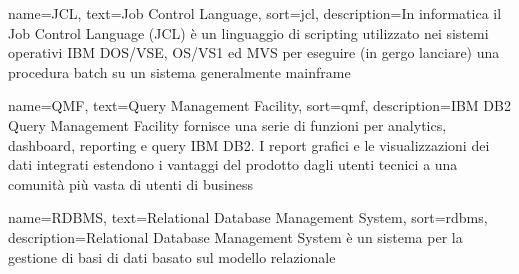
{
    name=JCL,
    text=Job Control Language,
    sort=jcl,
    description={In informatica il Job Control Language (JCL) è un linguaggio di scripting utilizzato nei sistemi operativi IBM DOS/VSE, OS/VS1 ed MVS per eseguire (in gergo lanciare) una procedura batch su un sistema generalmente mainframe}
}





{
    name=QMF,
    text=Query Management Facility,
    sort=qmf,
    description={IBM DB2 Query Management Facility fornisce una serie di funzioni per analytics, dashboard, reporting e query IBM DB2. I report grafici e le visualizzazioni dei dati integrati estendono i vantaggi del prodotto dagli utenti tecnici a una comunità più vasta di utenti di business}
}


{
    name=RDBMS,
    text=Relational Database Management System,
    sort=rdbms,
    description={Relational Database Management System è un sistema per la gestione di basi di dati basato sul modello relazionale}
}



